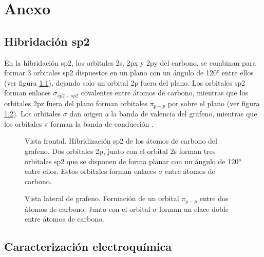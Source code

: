 \appendix
\chapter{Anexo}

\section{Hibridación sp2}
\label{sec:hibridacion_sp2}

En la hibridación sp2, los orbitales 2s, 2px y 2py del carbono, se combinan para formar 3 orbitales sp2 dispuestos en un plano con un ángulo de 120° entre ellos (ver figura \ref{fig:sp2_hybrid}), dejando solo un orbital 2p fuera del plano. Los orbitales sp2 forman enlaces $\sigma_{sp2-sp2}$ covalentes entre átomos de carbono, mientras que los orbitales 2pz fuera del plano forman orbitales $\pi_{p-p}$ por sobre el plano (ver figura \ref{fig:pi_orbitals}). Los orbitales $\sigma$ dan origen a la banda de valencia del grafeno, mientras que los orbitales $\pi$ forman la banda de conducción \citep{CastroNeto2009}.

\begin{figure}[h!]
	\centering
	\caption[Hibridización sp2]{Vista frontal. Hibridización sp2 de los átomos de carbono del grafeno. Dos orbitales 2p, junto con el orbital 2s forman tres orbitales sp2 que se disponen de forma planar con un ángulo de 120° entre ellos. Estos orbitales forman enlaces $\sigma$ entre átomos de carbono.}
	\label{fig:sp2_hybrid}
\end{figure}

\begin{figure}[h!]
	\centering
	\caption[Formación de un orbital $\pi$]{Vista lateral de grafeno. Formación de un orbital $\pi_{p-p}$ entre dos átomos de carbono. Junto con el orbital $\sigma$ forman un elace doble entre átomos de carbono.}
	\label{fig:pi_orbitals}
\end{figure}

\clearpage
\section{Caracterización electroquímica}
\label{sec:caracterizacion_electroquimica}

